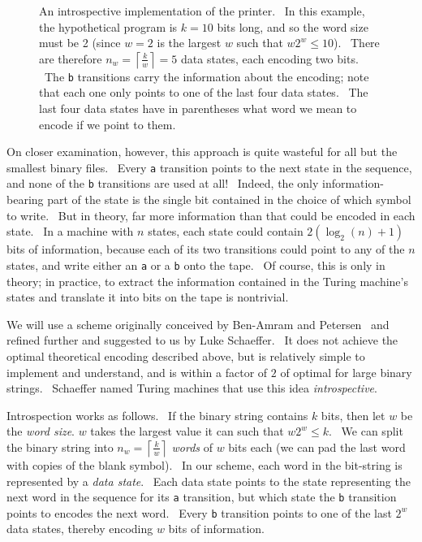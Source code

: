 \documentclass[11pt]{article}
\begin{document}
\begin{figure}
\begin{center}
\caption{An introspective implementation of the printer. \ In this example, the hypothetical program is $k=10$ bits long, and so the word size must be 2 (since $w=2$ is the largest $w$ such that $w2^w \le 10$). \ There are therefore $n_w = \left \lceil{\frac{k}{w}}\right \rceil = 5$ data states, each encoding two bits. \ The \texttt{b} transitions carry the information about the encoding; note that each one only points to one of the last four data states. \ The last four data states have in parentheses what word we mean to encode if we point to them. \label{fig:introspectprog}}
\end{center}
\end{figure}

On closer examination, however, this approach is quite wasteful for all but the smallest binary files. \ Every \texttt{a} transition points to the next state in the sequence, and none of the \texttt{b} transitions are used at all! \ Indeed, the only information-bearing part of the state is the single bit contained in the choice of which symbol to write. \ But in theory, far more information than that could be encoded in each state. \ In a machine with $n$ states, each state could contain $2(\log_2(n) + 1)$ bits of information, because each of its two transitions could point to any of the $n$ states, and write either an \texttt{a} or a \texttt{b} onto the tape. \ Of course, this is only in theory; in practice, to extract the information contained in the Turing machine's states and translate it into bits on the tape is nontrivial.

We will use a scheme originally conceived by Ben-Amram and Petersen~\cite{benamram} and refined further and suggested to us by Luke Schaeffer. \ It does not achieve the optimal theoretical encoding described above, but is relatively simple to implement and understand, and is within a factor of $2$ of optimal for large binary strings. \ Schaeffer named Turing machines that use this idea \emph{introspective}.

Introspection works as follows. \ If the binary string contains $k$ bits, then let $w$ be the \emph{word size}. $w$ takes the largest value it can such that $w2^w \le k$. \ We can split the binary string into $n_w = \left \lceil{\frac{k}{w}}\right \rceil$ \emph{words} of $w$ bits each (we can pad the last word with copies of the blank symbol). \ In our scheme, each word in the bit-string is represented by a \emph{data state}. \ Each data state points to the state representing the next word in the sequence for its \texttt{a} transition, but which state the \texttt{b} transition points to encodes the next word. \ Every \texttt{b} transition points to one of the last $2^w$ data states, thereby encoding $w$ bits of information.
\end{document}
